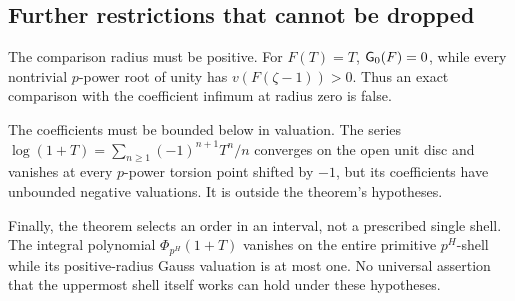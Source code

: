 \subsection{Further restrictions that cannot be dropped}

The comparison radius must be positive. For \(F(T)=T\),
\(\mathsf G_0(F)=0\), while every nontrivial \(p\)-power root of unity has
\(v(F(\zeta-1))>0\). Thus an exact comparison with the coefficient
infimum at radius zero is false.

The coefficients must be bounded below in valuation. The series
\(\log(1+T)=\sum_{n\ge1}(-1)^{n+1}T^n/n\) converges on the open
unit disc and vanishes at every \(p\)-power torsion point shifted by
\(-1\), but its coefficients have unbounded negative valuations.
It is outside the theorem's hypotheses.

Finally, the theorem selects an order in an interval, not a prescribed
single shell. The integral polynomial \(\Phi_{p^H}(1+T)\) vanishes on
the entire primitive \(p^H\)-shell while its positive-radius Gauss
valuation is at most one. No universal assertion that the uppermost
shell itself works can hold under these hypotheses.

